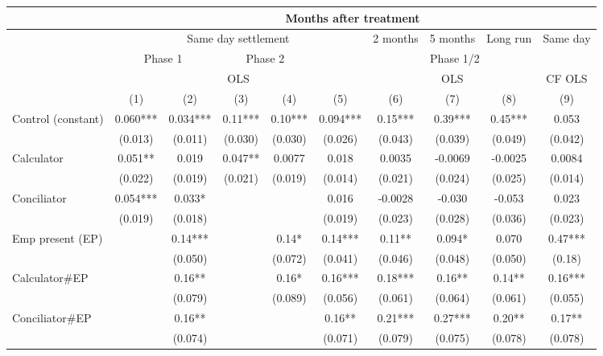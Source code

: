 \begin{tabular}{lccccccccc}
\toprule
\multicolumn{1}{|r}{} & \multicolumn{9}{c}{Months after treatment} \\
\midrule
\multicolumn{1}{r|}{} & \multicolumn{5}{c|}{Same day settlement} & \multicolumn{1}{c|}{2 months } & \multicolumn{1}{c|}{ 5 months} & \multicolumn{1}{c|}{Long run} & Same day  \\
\midrule
\midrule
\multicolumn{1}{r|}{} & \multicolumn{2}{c|}{Phase 1} & \multicolumn{2}{c|}{Phase 2} & \multicolumn{5}{c}{Phase 1/2} \\
\midrule
\multicolumn{1}{r|}{} & \multicolumn{5}{c|}{OLS}              & \multicolumn{3}{c|}{OLS} & CF OLS \\
\midrule
\midrule
      & (1)   & (2)   & (3)   & (4)   & (5)   & (6)   & (7)   & (8)   & (9) \\
\midrule
\midrule
Control (constant) & 0.060*** & 0.034*** & 0.11*** & 0.10*** & 0.094*** & 0.15*** & 0.39*** & 0.45*** & 0.053 \\
      & (0.013) & (0.011) & (0.030) & (0.030) & (0.026) & (0.043) & (0.039) & (0.049) & (0.042) \\
Calculator & 0.051** & 0.019 & 0.047** & 0.0077 & 0.018 & 0.0035 & -0.0069 & -0.0025 & 0.0084 \\
      & (0.022) & (0.019) & (0.021) & (0.019) & (0.014) & (0.021) & (0.024) & (0.025) & (0.014) \\
Conciliator & 0.054*** & 0.033* &       &       & 0.016 & -0.0028 & -0.030 & -0.053 & 0.023 \\
      & (0.019) & (0.018) &       &       & (0.019) & (0.023) & (0.028) & (0.036) & (0.023) \\
Emp present (EP) &       & 0.14*** &       & 0.14* & 0.14*** & 0.11** & 0.094* & 0.070 & 0.47*** \\
      &       & (0.050) &       & (0.072) & (0.041) & (0.046) & (0.048) & (0.050) & (0.18) \\
Calculator\#EP &       & 0.16** &       & 0.16* & 0.16*** & 0.18*** & 0.16** & 0.14** & 0.16*** \\
      &       & (0.079) &       & (0.089) & (0.056) & (0.061) & (0.064) & (0.061) & (0.055) \\
Conciliator\#EP &       & 0.16** &       &       & 0.16** & 0.21*** & 0.27*** & 0.20** & 0.17** \\
      &       & (0.074) &       &       & (0.071) & (0.079) & (0.075) & (0.078) & (0.078) \\

\end{tabular}
